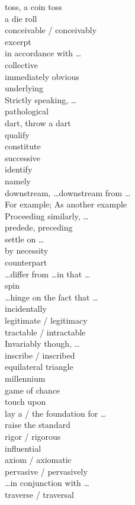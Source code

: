 \documentclass[12pt]{article}
\begin{document}
toss, a coin toss \\
a die roll \\
conceivable / conceivably \\
excerpt\\
in accordance with \dots \\
collective \\
immediately obvious \\
underlying \\
Strictly speaking, \dots \\
pathological \\
dart, throw a dart \\
qualify \\
constitute \\
successive \\
identify \\
namely \\
downstream, \dots downstream from \dots \\
For example; As another example \\
Proceeding similarly, \dots \\
predede, preceding \\
settle on \dots \\
by necessity \\
counterpart \\
\dots differ from \dots in that \dots \\
spin \\
\dots hinge on the fact that \dots \\
incidentally \\
legitimate / legitimacy \\
tractable / intractable \\
Invariably though, \dots \\
inscribe / inscribed \\
equilateral triangle \\
millennium \\
game of chance \\
touch upon \\
lay a / the foundation for \dots \\
raise the standard \\
rigor / rigorous \\
influential \\
axiom / axiomatic \\
pervasive / pervasively \\
\dots in conjunction with \dots \\
traverse / traversal \\
\end{document}
